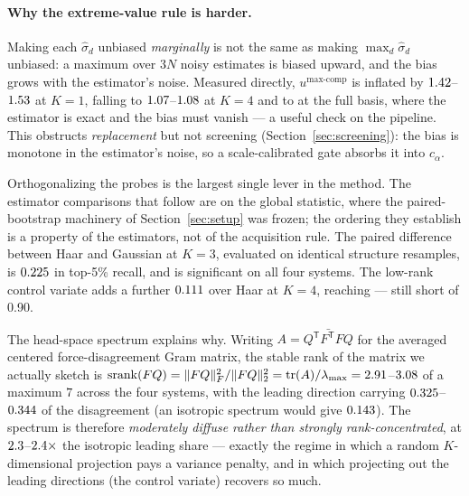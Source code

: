 \documentclass{article}
\begin{document}
\paragraph{Why the extreme-value rule is harder.}
Making each $\widehat\sigma_d$ unbiased \emph{marginally} is not the same as making
$\max_d\widehat\sigma_d$ unbiased: a maximum over $3N$ noisy estimates is biased upward, and the
bias grows with the estimator's noise. Measured directly, $u^{\max\text{-comp}}$ is inflated by
$1.42$--$1.53$ at $K{=}1$, falling to
$1.07$--$1.08$ at $K{=}4$ and to \fsMaxBiasExact{} at the full basis,
where the estimator is exact and the bias must vanish --- a useful check on the pipeline. This
obstructs \emph{replacement} but not screening (Section~\ref{sec:screening}): the bias is monotone
in the estimator's noise, so a scale-calibrated gate absorbs it into $c_\alpha$.

Orthogonalizing the probes is the largest single lever in the method. The estimator comparisons that
follow are on the global statistic, where the paired-bootstrap machinery of Section~\ref{sec:setup}
was frozen; the ordering they establish is a property of the estimators, not of the acquisition rule.
The paired difference between Haar and Gaussian at $K{=}3$, evaluated on identical structure
resamples, is
$0.225$ \fsDeltaOrthoCI{} in top-5\% recall, and is significant on all four systems. The
low-rank control variate adds a further $0.111$ \fsDeltaCVCI{} over Haar at $K{=}4$, reaching
\fsCVRecallKFour{} \fsCVRecallKFourCI{} --- still short of 0.90.

The head-space spectrum explains why. Writing $A=\bar{Q^{\mathsf T}F^{\mathsf T}FQ}$ for the averaged
centered force-disagreement Gram matrix, the stable rank of the matrix we actually sketch is
$\operatorname{srank}(FQ)=\|FQ\|_F^2/\|FQ\|_2^2=\operatorname{tr}(A)/\lambda_{\max}
=2.91$--$3.08$ of a maximum $7$ across the four systems, with the leading direction
carrying $0.325$--$0.344$ of the disagreement (an isotropic spectrum would give
$0.143$). The spectrum is therefore \emph{moderately diffuse rather than strongly
rank-concentrated}, at $2.3$--$2.4\times$ the isotropic leading share ---
exactly the regime in which a random $K$-dimensional projection pays a variance penalty, and in
which projecting out the leading directions (the control variate) recovers so much.


\end{document}
